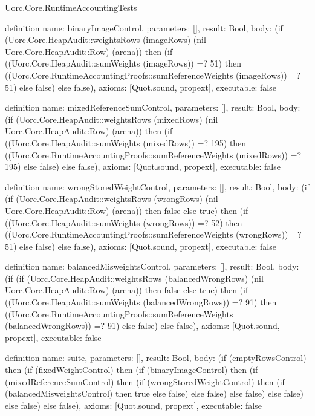 \begin{lexlean}{Uorc.Core.RuntimeAccountingTests}
\begin{semanticmodule}
definition{
  name: binaryImageControl,
  parameters: [],
  result: Bool,
  body: (if (Uorc.Core.HeapAudit::weightsRows (imageRows) (nil Uorc.Core.HeapAudit::Row) (arena)) then (if ((Uorc.Core.HeapAudit::sumWeights (imageRows)) =? 51) then ((Uorc.Core.RuntimeAccountingProofs::sumReferenceWeights (imageRows)) =? 51) else false) else false),
  axioms: [Quot.sound, propext],
  executable: false
}

definition{
  name: mixedReferenceSumControl,
  parameters: [],
  result: Bool,
  body: (if (Uorc.Core.HeapAudit::weightsRows (mixedRows) (nil Uorc.Core.HeapAudit::Row) (arena)) then (if ((Uorc.Core.HeapAudit::sumWeights (mixedRows)) =? 195) then ((Uorc.Core.RuntimeAccountingProofs::sumReferenceWeights (mixedRows)) =? 195) else false) else false),
  axioms: [Quot.sound, propext],
  executable: false
}

definition{
  name: wrongStoredWeightControl,
  parameters: [],
  result: Bool,
  body: (if (if (Uorc.Core.HeapAudit::weightsRows (wrongRows) (nil Uorc.Core.HeapAudit::Row) (arena)) then false else true) then (if ((Uorc.Core.HeapAudit::sumWeights (wrongRows)) =? 52) then ((Uorc.Core.RuntimeAccountingProofs::sumReferenceWeights (wrongRows)) =? 51) else false) else false),
  axioms: [Quot.sound, propext],
  executable: false
}

definition{
  name: balancedMisweightsControl,
  parameters: [],
  result: Bool,
  body: (if (if (Uorc.Core.HeapAudit::weightsRows (balancedWrongRows) (nil Uorc.Core.HeapAudit::Row) (arena)) then false else true) then (if ((Uorc.Core.HeapAudit::sumWeights (balancedWrongRows)) =? 91) then ((Uorc.Core.RuntimeAccountingProofs::sumReferenceWeights (balancedWrongRows)) =? 91) else false) else false),
  axioms: [Quot.sound, propext],
  executable: false
}

definition{
  name: suite,
  parameters: [],
  result: Bool,
  body: (if (emptyRowsControl) then (if (fixedWeightControl) then (if (binaryImageControl) then (if (mixedReferenceSumControl) then (if (wrongStoredWeightControl) then (if (balancedMisweightsControl) then true else false) else false) else false) else false) else false) else false),
  axioms: [Quot.sound, propext],
  executable: false
}
\end{semanticmodule}
\end{lexlean}
